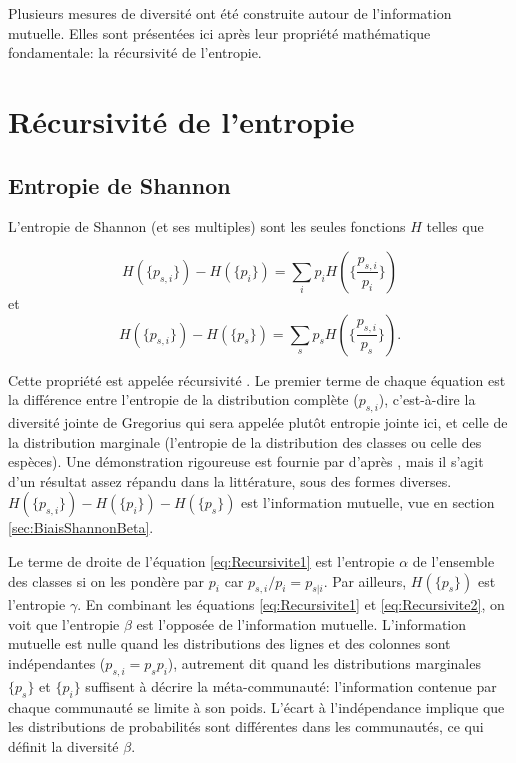 \documentclass[
  11pt,
  french,
  a4paper,
  extrafontsizes,onecolumn,openright
  ]{memoir}
\begin{document}
\normalsize

Plusieurs mesures de diversité ont été construite autour de l'information mutuelle.
Elles sont présentées ici après leur propriété mathématique fondamentale: la récursivité de l'entropie.

\hypertarget{ruxe9cursivituxe9-de-lentropie}{%
\section{Récursivité de l'entropie}\label{ruxe9cursivituxe9-de-lentropie}}

\hypertarget{sec:jointeShannon}{%
\subsection{Entropie de Shannon}\label{sec:jointeShannon}}

L'entropie de Shannon (et ses multiples) sont les seules fonctions \(H\) telles que

\begin{equation}
  \label{eq:Recursivite1}
  H\left(\{p_{s,i}\}\right)-H\left(\{p_i\}\right) 
  = \sum_i{p_i H\left(\{\frac{p_{s,i}}{p_i}\}\right)}
\end{equation}
et
\begin{equation}
  \label{eq:Recursivite2}
  H\left(\{p_{s,i}\}\right)-H\left(\{p_s\}\right) 
  = \sum_s{p_s H\left(\{\frac{p_{s,i}}{p_s}\}\right)}.
\end{equation}

Cette propriété est appelée récursivité \autocite{Bacaro2013}.
Le premier terme de chaque équation est la différence entre l'entropie de la distribution complète (\(p_{s,i}\)), c'est-à-dire la diversité jointe de Gregorius qui sera appelée plutôt entropie jointe ici, et celle de la distribution marginale (l'entropie de la distribution des classes ou celle des espèces).
Une démonstration rigoureuse est fournie par \textcite{Baez2011} d'après \textcite{Faddeev1956}, mais il s'agit d'un résultat assez répandu dans la littérature, sous des formes diverses\autocite{Aczel1975,Renyi1961,Bourguignon1979}.
\(H(\{p_{s,i}\})-H(\{p_i\})-H(\{p_s\})\) est l'information mutuelle, vue en section \ref{sec:BiaisShannonBeta}.

Le terme de droite de l'équation \eqref{eq:Recursivite1} est l'entropie \(\alpha\) de l'ensemble des classes si on les pondère par \(p_i\) car \({p_{s,i}}/{p_i}=p_{s|i}\).
Par ailleurs, \(H(\{p_s\})\) est l'entropie \(\gamma\).
En combinant les équations \eqref{eq:Recursivite1} et \eqref{eq:Recursivite2}, on voit que l'entropie \(\beta\) est l'opposée de l'information mutuelle.
L'information mutuelle est nulle quand les distributions des lignes et des colonnes sont indépendantes (\(p_{s,i}=p_{s}p_{i}\)), autrement dit quand les distributions marginales \(\{p_s\}\) et \(\{p_i\}\) suffisent à décrire la méta-communauté: l'information contenue par chaque communauté se limite à son poids.
L'écart à l'indépendance implique que les distributions de probabilités sont différentes dans les communautés, ce qui définit la diversité \(\beta\).
\end{document}
